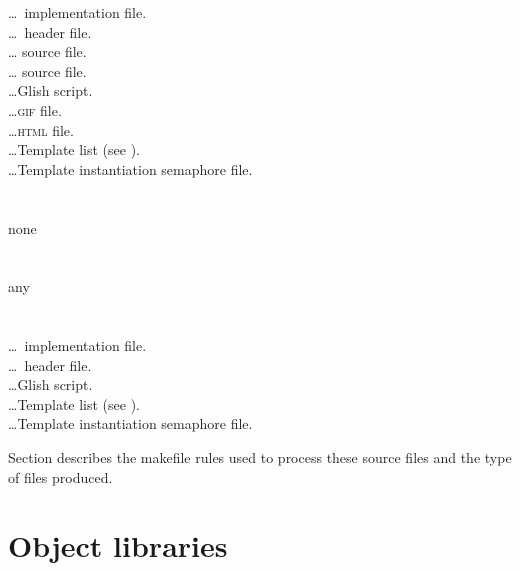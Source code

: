 \begin{tabbing}
                    \>\ldots \cplusplus\ implementation file.\\
                     \>\ldots \cplusplus\ header file.\\
                     \>\ldots {} source file.\\
                     \>\ldots {} source file.\\
                     \>\ldots Glish script.\\
                   \>\ldots \textsc{gif} file.\\
                  \>\ldots \textsc{html} file.\\
              \>\ldots Template list (see ).\\
        \>\ldots Template instantiation semaphore file.\\
\-\\
   \+\\
      none\\
\-\\
   \+\\
      any\\
\-\\
   \+\\
                    \>\ldots \cplusplus\ implementation file.\\
                     \>\ldots \cplusplus\ header file.\\
                     \>\ldots Glish script.\\
              \>\ldots Template list (see ).\\
        \>\ldots Template instantiation semaphore file.
\end{tabbing}

\noindent
Section  describes the makefile rules
used to process these source files and the type of files produced.


\newpage
\section{Object libraries}
\label{Object libraries}

